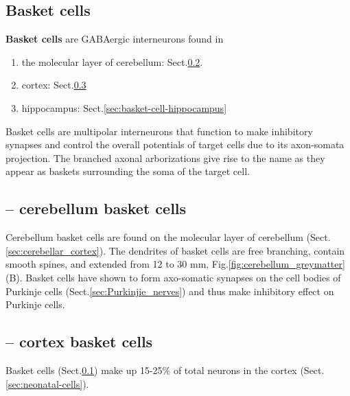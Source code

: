 \subsection{Basket cells}
\label{sec:basket-cell}

{\bf Basket cells} are GABAergic interneurons found in 
\begin{enumerate}
  \item the molecular layer of cerebellum:
  Sect.\ref{sec:basket-cell-cerebellum}.
  
  \item cortex: Sect.\ref{sec:basket-cell-cortex}
  
  \item hippocampus: Sect.\ref{sec:basket-cell-hippocampus}
\end{enumerate}

Basket cells are multipolar interneurons that function to make inhibitory
synapses and control the overall potentials of target cells due to its
axon-somata projection. The branched axonal arborizations give rise to the name
as they appear as baskets surrounding the soma of the target cell.

\subsection{-- cerebellum basket cells}
\label{sec:basket-cell-cerebellum}

Cerebellum basket cells are found  on the molecular layer of cerebellum
(Sect.\ref{sec:cerebellar_cortex}).
The dendrites of basket cells are free branching, contain smooth spines, and
extended from 12 to 30 mm, Fig.\ref{fig:cerebellum_greymatter}(B).
Basket cells have shown to form axo-somatic synapses on the cell bodies of
Purkinje cells (Sect.\ref{sec:Purkinjie_nerves}) and thus make inhibitory
effect on Purkinje cells.



\subsection{-- cortex basket cells}
\label{sec:basket-cell-cortex}

Basket cells (Sect.\ref{sec:basket-cell}) make up 15-25\% of total neurons in
the cortex (Sect.\ref{sec:neonatal-cells}).

